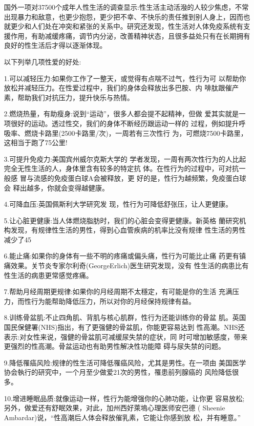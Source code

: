 \documentclass[12pt,UTF8]{ctexbook}
\begin{document}
国外一项对37500个成年人性生活的调查显示:性生活主动活潑的人较少焦虑，不常出现暴力和敌意，也更少抱怨，更少把不幸、不快乐的责任推到别人身上，因而也就更少和人们处在冲突和紧张的关系中。研究还发现，性生活对人体免疫系统有支援作用，有助减缓疼痛，调节内分泌，改善精神状态，且很多益处只有在长期拥有良好的性生活后才得以逐渐体现。

以下列举几项性爱的好处:

1.可以减轻压力:如果你工作了一整天，或觉得有点喘不过气，性行为可
以帮助你放松并减轻压力。在性爱过程中，我们的身体会释放出多巴胺、内
啡肽跟催产素，帮助我们对抗压力，提升快乐与热情。

2.燃烧热量，有助瘦身:说到“运动”，很多人都会提不起精神，但做
爱其实就是一项很好的运动。透过性交，我们的身体不断经历跟运动一样的
过程，例如提升呼吸率、燃烧卡路里(2500卡路里/次)，一周若有三次性行
为，可燃烧7500卡路里，这相当于跑了75公里!

3.可提升免疫力:美国宾州威尔克斯大学的
学者发现，一周有两次性行为的人比起完全无性生活的人，身体里含有较多的特定抗
体。在性行为的过程中，可对抗一般感
冒与流感的免疫蛋白球A会被释放，更
好的是，性行为越频繁，免疫蛋白球会
释出越多，你就会变得越健康。

4.可降血压:英国佩斯利大学研究发
现，性行为可降低舒张压，让人更健康。

5.让心脏更健康:当人体燃烧脂肪时，我们的心脏会变得更健康。新英格
蘭研究机构发现，有规律性生活的男性，得到心血管疾病的机率比没有规律
性生活的男性减少了45%

6.能止痛:如果你的身体有一些不明的疼痛或偏头痛，性行为可能比止痛
药更有镇痛效果。关节炎专家尔利奇(GeorgeErlich)医生研究发现，没有
性生活的病患比有性生活的病患更常感觉疼痛。

7.帮助月经周期更规律:如果你的月经周期不太穩定，有可能是你的生活
充满压力，而性行为能帮助降低压力，所以对你的月经保持规律有益。

8.训练骨盆肌:不止四角肌、背肌与核心肌群，性行为还能训练你的骨盆
肌。英国国民保健署(NHS)指出，有了更强健的骨盆肌，你能更容易达到
性高潮。NHS还表示:对女性来说，强健的骨盆肌可减缓尿失禁的症状，同
时可增加敏感度，带来更强烈的性高潮。骨盆运动也有助男性解决性功能障
碍与尿失禁的问题。

9.降低罹癌风险:规律的性生活可降低罹癌风险，尤其是男性。在一项由
美国医学协会執行的研究中，一个月至少做爱21次的男性，罹患前列腺癌的
风险降低很多。

10.增进睡眠品质:就像运动一样，性行为能增强你的心肺功能，让你更
容易放松;另外，做爱还有舒眠效果，对此，加州西好萊塢心理医师安巴德
( Sheenie Ambardar)说，“性高潮后人体会释放催乳素，它能让你感到放
松，并有睡意。”
\end{document}

